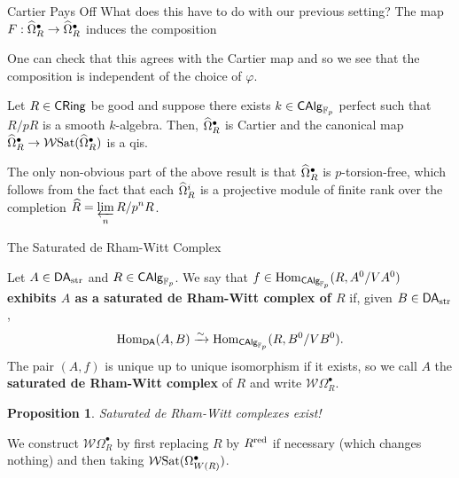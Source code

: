 \documentclass[aspectratio=1610]{beamer}
\newcommand{\DA}{\mathsf{DA}}
\newcommand{\Sat}{\textup{Sat}}
\newcommand{\str}{\textup{str}}
\newcommand{\W}{\mathcal{W}}
\renewcommand{\phi}{\varphi}
\newtheorem{proposition}{Proposition}
\begin{document}
\begin{frame}[fragile]{Cartier Pays Off}
What does this have to do with our previous setting? The map $F: \widehat{\Omega}_R^{\bullet}\to\widehat{\Omega}_R^{\bullet}$ induces the composition
\begin{center}
\end{center}
One can check that this agrees with the Cartier map and so we see that the composition is independent of the choice of $\phi$.

\begin{corollary}
Let $R\in\operatorname{\mathsf{CRing}}$ be good and suppose there exists $k\in\operatorname{\mathsf{CAlg}}_{\mathbb{F}_p}$ perfect such that $R/pR$ is a smooth $k$-algebra. Then, $\widehat{\Omega}_R^{\bullet}$ is Cartier and the canonical map $\w{\Omega}_R^{\bullet}\to\W\Sat(\w{\Omega}_R^{\bullet})$ is a qis.
\end{corollary}

The only non-obvious part of the above result is that $\widehat{\Omega}_R^{\bullet}$ is $p$-torsion-free, which follows from the fact that each $\widehat{\Omega}_R^i$ is a projective module of finite rank over the completion $\widehat{R}=\displaystyle\varprojlim_nR/p^nR$.
\end{frame}

\begin{frame}{The Saturated de Rham-Witt Complex}
\begin{definition}
Let $A\in\DA_{\str}$ and $R\in\operatorname{\mathsf{CAlg}}_{\mathbb{F}_p}$. We say that $f\in\operatorname{Hom}_{\operatorname{\mathsf{CAlg}}_{\mathbb{F}_p}}(R,A^0/VA^0)$ \textbf{exhibits $A$ as a saturated de Rham-Witt complex of $R$} if, given $B\in\DA_{\str}$, 
$$\Hom_{\DA}(A,B)\xto{\sim}\Hom_{\CAlg_{\F_p}}(R,B^0/VB^0).$$
The pair $(A,f)$ is unique up to unique isomorphism if it exists, so we call $A$ the \textbf{saturated de Rham-Witt complex} of $R$ and write $\W\Omega_R^{\bullet}$.
\end{definition}

\begin{proposition}
Saturated de Rham-Witt complexes exist!
\end{proposition}

We construct $\W\Omega_R^{\bullet}$ by first replacing $R$ by $R^{\operatorname{red}}$ if necessary (which changes nothing) and then taking $\W\Sat(\Omega_{W(R)}^{\bullet})$.
\end{frame}
\end{document}
